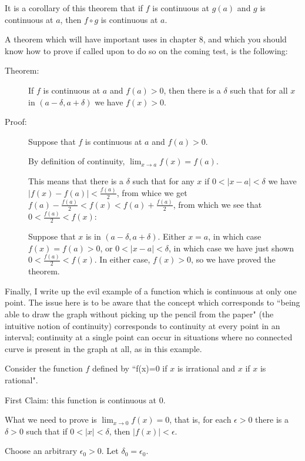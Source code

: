 \documentclass[12pt]{article}
\begin{document}
It is a corollary of this theorem that if $f$ is continuous at $g(a)$ and $g$ is continuous at $a$, then $f \circ g$ is continuous at $a$.

\newpage

A theorem which will have important uses in chapter 8, and which you should know how to prove if called upon to do so on the coming test, is the following:

\begin{description}

\item[Theorem:]  If $f$ is continuous at $a$ and $f(a)>0$, then there is a $\delta$ such that for all $x$ in $(a-\delta,a+\delta)$ we have $f(x)>0$.

\item[Proof:]  Suppose that $f$ is continuous at $a$ and $f(a)>0$.

By definition of continuity, $\lim_{x \rightarrow a}f(x)=f(a)$.

This means that there is a $\delta$ such that for any $x$ if $0<|x-a|<\delta$ we have $|f(x)-f(a)|<\frac{f(a)}2$, from whice we get $f(a)-\frac{f(a)}2<f(x)<f(a)+\frac{f(a)}2$, from which we see that $0<\frac{f(a)}2<f(x)$:

Suppose that $x$ is in $(a-\delta,a+\delta)$.  Either $x=a$, in which case $f(x)=f(a)>0$, or $0<|x-a|<\delta$, in which case we have just shown $0<\frac{f(a)}2<f(x)$.  In either case,
$f(x)>0$, so we have proved the theorem.

\end{description}

Finally, I write up the evil example of a function which is continuous at only one point.  The issue here is to be aware that the concept which corresponds to ``being able to draw the graph without picking up the pencil from the paper"
(the intuitive notion of continuity) corresponds to continuity at every point in an interval; continuity at a single point can occur in situations where no connected curve is present in the graph at all, as in this example.

Consider the function $f$ defined by ``f(x)=0 if $x$ is irrational and $x$ if $x$ is rational".

First Claim:  this function is continuous at 0.

What we need to prove is $\lim_{x \rightarrow 0}f(x)=0$, that is, for each $\epsilon>0$ there is a $\delta>0$ such that if $0<|x|<\delta$, then $|f(x)|<\epsilon$.

Choose an arbitrary $\epsilon_0>0$.  Let $\delta_0=\epsilon_0$.
\end{document}
